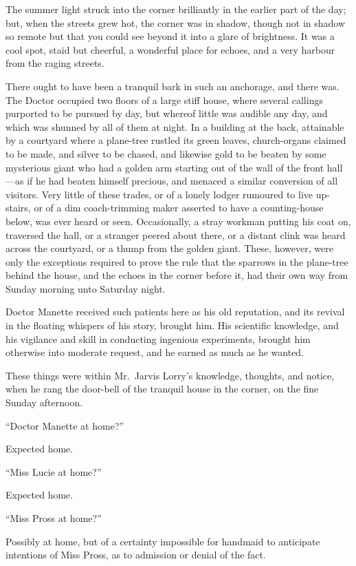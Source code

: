 The summer light struck into the corner brilliantly in the earlier
part of the day; but, when the streets grew hot, the corner was in
shadow, though not in shadow so remote but that you could see beyond
it into a glare of brightness.  It was a cool spot, staid but cheerful,
a wonderful place for echoes, and a very harbour from the raging streets.

There ought to have been a tranquil bark in such an anchorage, and
there was.  The Doctor occupied two floors of a large stiff house,
where several callings purported to be pursued by day, but whereof
little was audible any day, and which was shunned by all of them at
night.  In a building at the back, attainable by a courtyard where a
plane-tree rustled its green leaves, church-organs claimed to be
made, and silver to be chased, and likewise gold to be beaten by some
mysterious giant who had a golden arm starting out of the wall of the
front hall---as if he had beaten himself precious, and menaced a similar
conversion of all visitors.  Very little of these trades, or of a
lonely lodger rumoured to live up-stairs, or of a dim coach-trimming
maker asserted to have a counting-house below, was ever heard or seen.
Occasionally, a stray workman putting his coat on, traversed the
hall, or a stranger peered about there, or a distant clink was heard
across the courtyard, or a thump from the golden giant.  These,
however, were only the exceptions required to prove the rule that the
sparrows in the plane-tree behind the house, and the echoes in the
corner before it, had their own way from Sunday morning unto Saturday
night.

Doctor Manette received such patients here as his old reputation,
and its revival in the floating whispers of his story, brought him.
His scientific knowledge, and his vigilance and skill in conducting
ingenious experiments, brought him otherwise into moderate request,
and he earned as much as he wanted.

These things were within Mr.\ Jarvis Lorry's knowledge, thoughts, and
notice, when he rang the door-bell of the tranquil house in the corner,
on the fine Sunday afternoon.

``Doctor Manette at home?''

Expected home.

``Miss Lucie at home?''

Expected home.

``Miss Pross at home?''

Possibly at home, but of a certainty impossible for handmaid to anticipate
intentions of Miss Pross, as to admission or denial of the fact.

